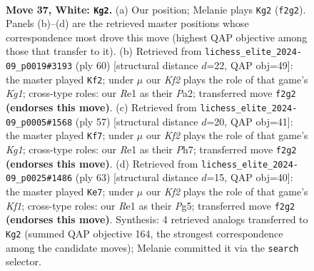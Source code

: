 \documentclass[11pt]{article}
\begin{document}
\clearpage

\begin{figure}[p]\centering
\begin{subfigure}{0.46\textwidth}\centering
\resizebox{\linewidth}{!}{%
\newchessgame
\chessboard[
  setfen={1r6/1p3pk1/p3p3/8/P3P3/5P1P/1R3K1P/4R3 w - - 3 37},
  showmover=false,
  pgfstyle=straightmove, color=movearrow, markmove={f2-g2}
]}
\caption{}
\end{subfigure}\hfill
\begin{subfigure}{0.46\textwidth}\centering
\resizebox{\linewidth}{!}{%
\newchessgame
\chessboard[
  setfen={2r5/4k1p1/p1p4p/5P2/5P2/7P/P5P1/2R3K1 w - - 1 31},
  showmover=false,
  pgfstyle=straightmove, color=movearrow, markmove={g1-f2}
]}
\caption{}
\end{subfigure}
\\[4pt]
\begin{subfigure}{0.46\textwidth}\centering
\resizebox{\linewidth}{!}{%
\newchessgame
\chessboard[
  setfen={1r4k1/7p/2p2p2/8/1Pp1pP2/6P1/5K1P/1R6 b - - 1 29},
  showmover=false,
  pgfstyle=straightmove, color=movearrow, markmove={g8-f7}
]}
\caption{}
\end{subfigure}\hfill
\begin{subfigure}{0.46\textwidth}\centering
\resizebox{\linewidth}{!}{%
\newchessgame
\chessboard[
  setfen={2r2k2/pp3pp1/4p3/6pP/P1P3P1/8/5P2/2R2K2 b - - 4 32},
  showmover=false,
  pgfstyle=straightmove, color=movearrow, markmove={f8-e7}
]}
\caption{}
\end{subfigure}
\caption{\textbf{Move 37, White: \texttt{Kg2}.} (a) Our position; Melanie plays \texttt{Kg2} (\texttt{f2g2}). Panels (b)--(d) are the retrieved master positions whose correspondence most drove this move (highest QAP objective among those that transfer to it). (b) Retrieved from \texttt{lichess\_elite\_2024-09\_p0019\#3193} (ply 60) [structural distance $d$=22, QAP obj=49]: the master played \texttt{Kf2}; under $\mu$ our \emph{Kf2} plays the role of that game's \emph{Kg1}; cross-type roles: our \emph{R}e1 as their \emph{P}a2; transferred move \texttt{f2g2} \textbf{(endorses this move)}. (c) Retrieved from \texttt{lichess\_elite\_2024-09\_p0005\#1568} (ply 57) [structural distance $d$=20, QAP obj=41]: the master played \texttt{Kf7}; under $\mu$ our \emph{Kf2} plays the role of that game's \emph{Kg1}; cross-type roles: our \emph{R}e1 as their \emph{P}h7; transferred move \texttt{f2g2} \textbf{(endorses this move)}. (d) Retrieved from \texttt{lichess\_elite\_2024-09\_p0025\#1486} (ply 63) [structural distance $d$=15, QAP obj=40]: the master played \texttt{Ke7}; under $\mu$ our \emph{Kf2} plays the role of that game's \emph{Kf1}; cross-type roles: our \emph{R}e1 as their \emph{P}g5; transferred move \texttt{f2g2} \textbf{(endorses this move)}. Synthesis: 4 retrieved analogs transferred to \texttt{Kg2} (summed QAP objective 164, the strongest correspondence among the candidate moves); Melanie committed it via the \texttt{search} selector.}
\label{fig:thought-m72}
\end{figure}
\end{document}
